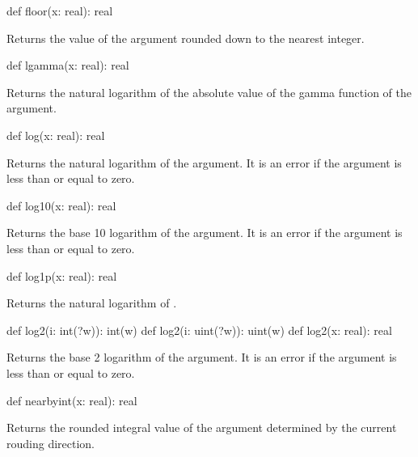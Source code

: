 \begin{protohead}
def floor(x: real): real
\end{protohead}
\begin{protobody}
Returns the value of the argument rounded down to the nearest integer.
\end{protobody}

\begin{protohead}
def lgamma(x: real): real
\end{protohead}
\begin{protobody}
Returns the natural logarithm of the absolute value of the gamma
function of the argument.
\end{protobody}

\begin{protohead}
def log(x: real): real
\end{protohead}
\begin{protobody}
Returns the natural logarithm of the argument.  It is an error if the
argument is less than or equal to zero.
\end{protobody}

\begin{protohead}
def log10(x: real): real
\end{protohead}
\begin{protobody}
Returns the base 10 logarithm of the argument.  It is an error if the
argument is less than or equal to zero.
\end{protobody}

\begin{protohead}
def log1p(x: real): real
\end{protohead}
\begin{protobody}
Returns the natural logarithm of .
\end{protobody}

\begin{protohead}
def log2(i: int(?w)): int(w)
def log2(i: uint(?w)): uint(w)
def log2(x: real): real
\end{protohead}
\begin{protobody}
Returns the base 2 logarithm of the argument.  It is an error if the
argument is less than or equal to zero.
\end{protobody}

\begin{protohead}
def nearbyint(x: real): real
\end{protohead}
\begin{protobody}
Returns the rounded integral value of the argument determined by the
current rouding direction.
\end{protobody}

